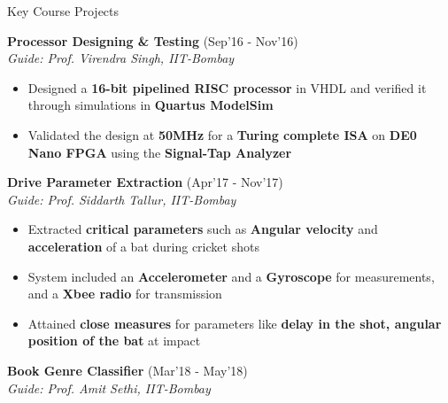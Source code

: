 \documentclass{resume}
\newcommand{\sepval}{-0.5em}
\begin{document}
\begin{rSection}{Key Course Projects}
\begin{itemize}[leftmargin=*]
\end{itemize}

\item {\bf Processor Designing \& Testing}  \hfill {(Sep'16 - Nov'16)}\\

\emph{Guide: Prof. Virendra Singh, IIT-Bombay}\\
[-0.6cm]

\begin{itemize}[leftmargin=*]

	\itemsep \sepval

	\item Designed a {\bf 16-bit pipelined RISC processor} in VHDL and verified it through simulations in {\bf Quartus ModelSim}

	\item Validated the design at {\bf 50MHz} for a {\bf Turing complete ISA} on {\bf DE0 Nano FPGA} using the {\bf Signal-Tap Analyzer} 

\end{itemize}


\item {\bf Drive Parameter Extraction} \hfill {(Apr'17 - Nov'17)} \\

\emph{Guide: Prof. Siddarth Tallur, IIT-Bombay}\\ 
[-0.6cm]

\begin{itemize}[leftmargin=*]
  
	\itemsep \sepval

	\item Extracted {\bf critical parameters} such as {\bf Angular velocity} and {\bf acceleration} of a bat during cricket shots 
	      
	\item System included an {\bf Accelerometer} and a {\bf Gyroscope} for measurements, and a {\bf Xbee radio} for transmission
	      
	\item Attained {\bf close measures} for parameters like {\bf delay in the shot, angular position of the bat} at impact
  
\end{itemize}


\item {\bf{Book Genre Classifier}} \hfill{(Mar'18 - May'18)}\\

\emph{Guide: Prof. Amit Sethi, IIT-Bombay}\\
[ -0.6cm]


\end{rSection}
\end{document}
